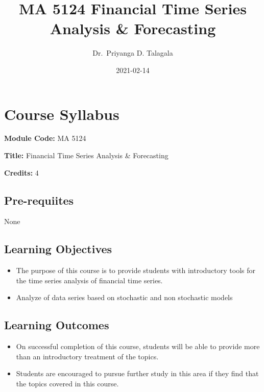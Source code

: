\documentclass[]{book}
\title{MA 5124 Financial Time Series Analysis \& Forecasting}
\author{Dr.~Priyanga D. Talagala}
\date{2021-02-14}
\providecommand{\tightlist}{%
  \setlength{\itemsep}{0pt}\setlength{\parskip}{0pt}}
\begin{document}
\maketitle

{
\setcounter{tocdepth}{1}
\tableofcontents
}
\hypertarget{course-syllabus}{%
\chapter*{Course Syllabus}\label{course-syllabus}}


\textbf{Module Code:} MA 5124

\textbf{Title:} Financial Time Series Analysis \& Forecasting

\textbf{Credits:} 4

\hypertarget{pre-requiites}{%
\section*{Pre-requiites}\label{pre-requiites}}

None

\hypertarget{learning-objectives}{%
\section*{Learning Objectives}\label{learning-objectives}}

\begin{itemize}
\tightlist
\item
  The purpose of this course is to provide students with introductory tools for the time series analysis of financial time series.
\item
  Analyze of data series based on stochastic and non stochastic models
\end{itemize}

\hypertarget{learning-outcomes}{%
\section*{Learning Outcomes}\label{learning-outcomes}}

\begin{itemize}
\tightlist
\item
  On successful completion of this course, students will be able to provide more than an introductory treatment of the topics.
\item
  Students are encouraged to pursue further study in this area if they find that the topics covered in this course.
\end{itemize}
\end{document}
